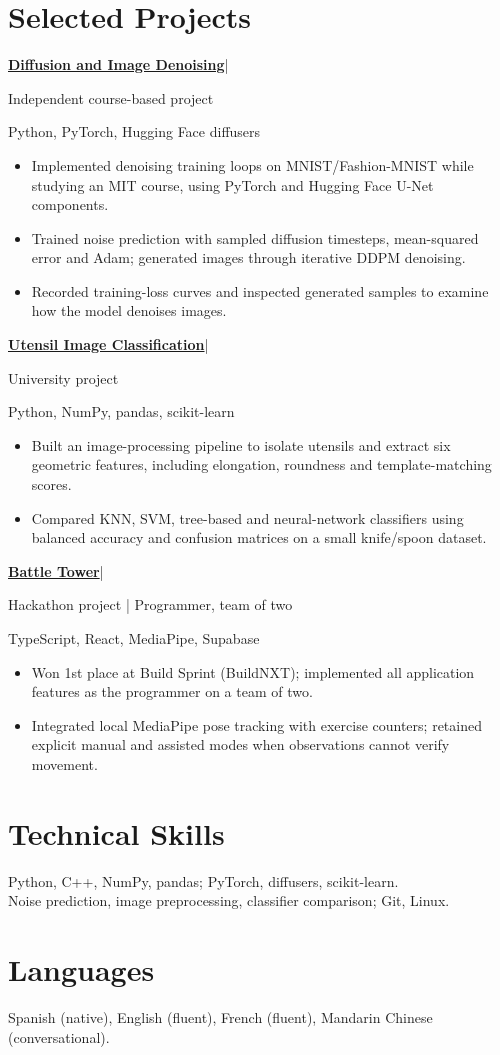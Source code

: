 \documentclass[11pt,a4paper]{article}
\newcommand{\entry}[2]{\textbf{#1}\enspace|\enspace{\small #2}\par}
\begin{document}
\section{Selected Projects}
\entry{\href{https://github.com/Javpato/diffusion-model}{Diffusion and Image Denoising}}{2026}
{\small Independent course-based project}\par
{\small Python, PyTorch, Hugging Face diffusers}\par
\begin{itemize}
\item Implemented denoising training loops on MNIST/Fashion-MNIST while studying an MIT course, using PyTorch and Hugging Face U-Net components.
\item Trained noise prediction with sampled diffusion timesteps, mean-squared error and Adam; generated images through iterative DDPM denoising.
\item Recorded training-loss curves and inspected generated samples to examine how the model denoises images.
\end{itemize}
\entry{\href{https://github.com/Javpato/Data-Science-Spoon-knives}{Utensil Image Classification}}{2026}
{\small University project}\par
{\small Python, NumPy, pandas, scikit-learn}\par
\begin{itemize}
\item Built an image-processing pipeline to isolate utensils and extract six geometric features, including elongation, roundness and template-matching scores.
\item Compared KNN, SVM, tree-based and neural-network classifiers using balanced accuracy and confusion matrices on a small knife/spoon dataset.
\end{itemize}
\entry{\href{https://github.com/Javpato/real-life-battle-tower}{Battle Tower}}{Nov 2026}
{\small Hackathon project | Programmer, team of two}\par
{\small TypeScript, React, MediaPipe, Supabase}\par
\begin{itemize}
\item Won 1st place at Build Sprint (BuildNXT); implemented all application features as the programmer on a team of two.
\item Integrated local MediaPipe pose tracking with exercise counters; retained explicit manual and assisted modes when observations cannot verify movement.
\end{itemize}
\section{Technical Skills}
Python, C++, NumPy, pandas; PyTorch, diffusers, scikit-learn.\\[2pt]
Noise prediction, image preprocessing, classifier comparison; Git, Linux.
\section{Languages}
Spanish (native), English (fluent), French (fluent), Mandarin Chinese (conversational).
\end{document}
